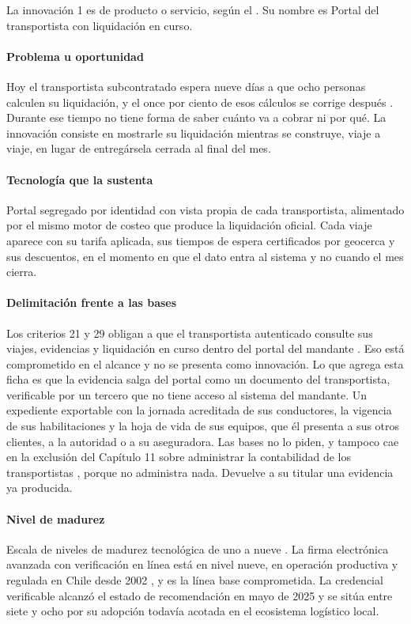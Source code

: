 La innovación 1 es de producto o servicio, según el . Su nombre es Portal del
transportista con liquidación en curso.

\paragraph{Problema u oportunidad} Hoy el transportista subcontratado espera nueve días a que ocho
personas calculen su liquidación, y el once por ciento de esos cálculos se corrige después
. Durante ese tiempo no tiene forma de saber cuánto va a cobrar ni por qué. La
innovación consiste en mostrarle su liquidación mientras se construye, viaje a viaje, en lugar de
entregársela cerrada al final del mes.

\paragraph{Tecnología que la sustenta} Portal segregado por identidad con vista propia de cada
transportista, alimentado por el mismo motor de costeo que produce la liquidación oficial. Cada viaje
aparece con su tarifa aplicada, sus tiempos de espera certificados por geocerca y sus descuentos, en el
momento en que el dato entra al sistema y no cuando el mes cierra.

\paragraph{Delimitación frente a las bases} Los criterios 21 y 29 obligan a que el transportista
autenticado consulte sus viajes, evidencias y liquidación en curso dentro del portal del mandante
. Eso está comprometido en el alcance y no se presenta como innovación. Lo que
agrega esta ficha es que la evidencia salga del portal como un documento del transportista, verificable
por un tercero que no tiene acceso al sistema del mandante. Un expediente exportable con la jornada
acreditada de sus conductores, la vigencia de sus habilitaciones y la hoja de vida de sus equipos, que
él presenta a sus otros clientes, a la autoridad o a su aseguradora. Las bases no lo piden, y tampoco
cae en la exclusión del Capítulo 11 sobre administrar la contabilidad de los transportistas
, porque no administra nada. Devuelve a su titular una evidencia ya producida.

\paragraph{Nivel de madurez} Escala de niveles de madurez tecnológica de uno a nueve
\parencite{iso16290}. La firma electrónica avanzada con verificación en línea está en nivel nueve, en
operación productiva y regulada en Chile desde 2002 \parencite{ley19799}, y es la línea base
comprometida. La credencial verificable alcanzó el estado de recomendación en mayo de 2025
\parencite{w3c_vcdm2} y se sitúa entre siete y ocho por su adopción todavía acotada en el ecosistema
logístico local.

